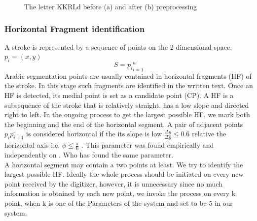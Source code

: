 \documentclass[12pt,journal,compsoc]{IEEEtran}
\begin{document}
\begin{figure}[h]
	\centering
    \caption{The letter KKRL{d} before (a) and after (b) preprocessing}
   \label{fig:same_main_body_letters}
\end{figure}

\subsubsection{Horizontal Fragment identification}

A stroke is represented by a sequence of points on the 2-dimensional space, $p_{i}=(x,y)$ 
\begin{equation}
S={p_{i}}_{i=1}^{n}
\end{equation}
Arabic segmentation points are usually contained in horizontal fragments (HF) of the stroke. In this stage such fragments are identified in the written text. Once an HF is detected, its medial point is set as a candidate point (CP). A HF is a subsequence of the stroke that is relatively straight, has a low slope and directed right to left. In the ongoing process to get the largest possible HF, we mark both the beginning and the end of the horizontal segment. 
A pair of adjacent points $\overline{p_{i}p_{i+1}}$ is considered horizontal if the its slope is low $\frac{\Delta y}{\Delta y}\leq0.6$ relative the horizontal axis i.e. $\phi \leq \frac{\pi}{6}$ . This parameter was found empirically and independently on \cite{daifallah2009recognition}. Who has found the same parameter. \\

A horizontal segment may contain a two points at least. We try to identify the largest possible HF. Ideally the whole process should be initiated on every new point received by the digitizer, however, it is unnecessary since no much information is obtained by each new point, we invoke the process on every k point, when k is one of the Parameters of the system and set to be 5 in our system.   
\end{document}
